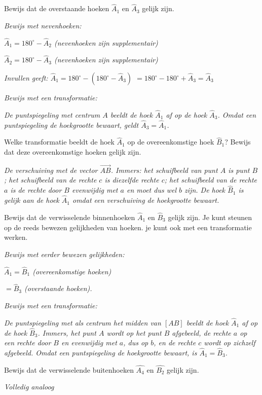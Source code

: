 
\begin{werktekstoef}
\setcounter{enumi}{6}  

\item{Bewijs dat de overstaande hoeken $\hat{A}_1$ en $\hat{A}_3$ gelijk zijn.}

\emph{Bewijs met nevenhoeken:}

\emph{$\hat{A}_1 =180^\circ-\hat{A}_2$ (nevenhoeken zijn supplementair)}

\emph{$\hat{A}_2 =180^\circ- \hat{A}_{3}$ (nevenhoeken zijn supplementair)}

\emph{Invullen geeft: $\hat{A}_1 =180^\circ-(180^\circ-\hat{A}_3)$
$=180^\circ-180^\circ+\hat{A}_3=\hat{A}_3$}

\emph{Bewijs met een transformatie:}

\emph{De puntspiegeling met centrum $A$ beeldt de hoek $\hat{A}_1$ af op de hoek $\hat{A}_3$. Omdat een puntspiegeling de hoekgrootte bewaart, geldt $\hat{A}_3=\hat{A}_1$.}

\item{Welke transformatie beeldt de hoek $\hat{A}_1$ op de overeenkomstige hoek $\hat{B}_1$? Bewijs dat deze overeenkomstige hoeken gelijk zijn.}

\emph{De verschuiving met de vector $\overrightarrow{AB}$. Immers: het schuifbeeld van punt $A$ is punt $B$; het schuifbeeld van de rechte $c$ is diezelfde rechte $c$; het schuifbeeld van de rechte $a$ is de rechte door $B$ evenwijdig met $a$ en moet dus wel $b$ zijn. De hoek $\hat{B}_1$ is gelijk aan de hoek $\hat{A}_1$ omdat een verschuiving de hoekgrootte bewaart.}

\item{Bewijs dat de verwisselende binnenhoeken $\hat{A}_1$ en $\hat{B}_3$ gelijk zijn. Je kunt steunen op de reeds bewezen gelijkheden van hoeken. je kunt ook met een transformatie werken.}

\emph{Bewijs met eerder bewezen gelijkheden:}

\emph{$\hat{A}_1=\hat{B}_1$ (overeenkomstige hoeken)}

\emph{\:\:\:\:\:\:$=\hat{B}_3$ (overstaande hoeken).}

\emph{Bewijs met een transformatie:}

\emph{De puntspiegeling met als centrum het midden van $[AB]$ beeldt de hoek $\hat{A}_1$ af op de hoek $\hat{B}_3$. Immers, het punt $A$ wordt op het punt $B$ afgebeeld, de rechte $a$ op een rechte door $B$ en evenwijdig met $a$, dus op $b$, en de rechte $c$ wordt op zichzelf afgebeeld. Omdat een puntspiegeling de hoekgrootte bewaart, is $\hat{A}_1=\hat{B}_3$.}

\item{Bewijs dat de verwisselende buitenhoeken $\hat{A_4}$ en $\hat{B_2}$ gelijk zijn.}

\emph{Volledig analoog}
\end{werktekstoef}

